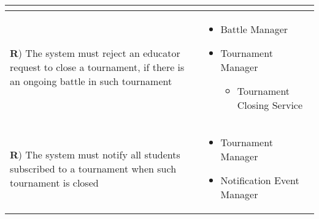 \documentclass[../DD.tex]{subfiles}
\newcounter{rown}
\newcommand{\rowIndex}{\arabic{rown}\stepcounter{rown}}
\begin{document}
\begin{table}[h!]
\begin{center}
\begin{tabular}{|m{20em}|m{20em}|}
\begin{itemize}
            \end{itemize}\\
            \hline
            \textbf{R\rowIndex}) The system must reject an educator request to close a tournament, if there is an ongoing battle in such tournament & \begin{itemize}
                \item Battle Manager
                \item Tournament Manager
                \begin{itemize}
                    \item Tournament Closing Service
                \end{itemize} 
            \end{itemize}\\
            \hline
            \textbf{R\rowIndex}) The system must notify all students subscribed to a tournament when such tournament is closed & \begin{itemize}
                \item Tournament Manager
                \item Notification Event Manager
            \end{itemize}\\
            \hline
            \end{tabular}
        \end{center}
    \end{table}
\end{document}
